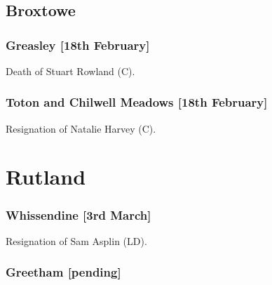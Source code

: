 \documentclass[a4paper,openany]{book}
\begin{document}
\begin{resultsiii}
\section[Nottinghamshire]{}

\subsection*{Broxtowe}

\subsubsection*{Greasley \hspace*{\fill}\nolinebreak[1]%
\enspace\hspace*{\fill}
[18th February]}


Death of Stuart Rowland (C).

\subsubsection*{Toton and Chilwell Meadows \hspace*{\fill}\nolinebreak[1]%
\enspace\hspace*{\fill}
[18th February]}


Resignation of Natalie Harvey (C).

\section{Rutland}

\subsubsection*{Whissendine \hspace*{\fill}\nolinebreak[1]%
\enspace\hspace*{\fill}
[3rd March]}


Resignation of Sam Asplin (LD).

\subsubsection*{Greetham \hspace*{\fill}\nolinebreak[1]%
\enspace\hspace*{\fill}
[pending]}


\end{resultsiii}
\end{document}
